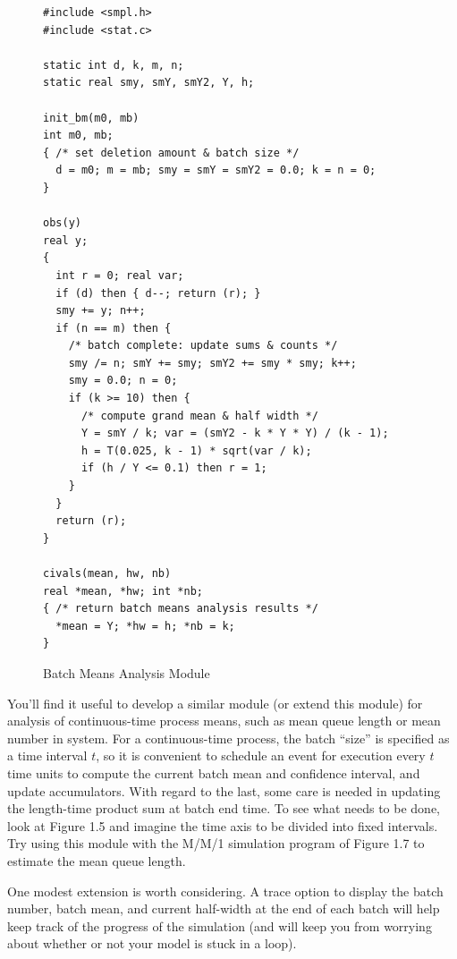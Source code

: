 \begin{figure}[H]
\centering
\begin{lstlisting}[basicstyle=\ttfamily\small,language={}]
#include <smpl.h>
#include <stat.c>

static int d, k, m, n;
static real smy, smY, smY2, Y, h;

init_bm(m0, mb)
int m0, mb;
{ /* set deletion amount & batch size */
  d = m0; m = mb; smy = smY = smY2 = 0.0; k = n = 0;
}

obs(y)
real y;
{
  int r = 0; real var;
  if (d) then { d--; return (r); }
  smy += y; n++;
  if (n == m) then {
    /* batch complete: update sums & counts */
    smy /= n; smY += smy; smY2 += smy * smy; k++;
    smy = 0.0; n = 0;
    if (k >= 10) then {
      /* compute grand mean & half width */
      Y = smY / k; var = (smY2 - k * Y * Y) / (k - 1);
      h = T(0.025, k - 1) * sqrt(var / k);
      if (h / Y <= 0.1) then r = 1;
    }
  }
  return (r);
}

civals(mean, hw, nb)
real *mean, *hw; int *nb;
{ /* return batch means analysis results */
  *mean = Y; *hw = h; *nb = k;
}
\end{lstlisting}
\caption{Batch Means Analysis Module}
\end{figure}
You'll find it useful to develop a similar module (or extend this module)
for analysis of continuous-time process means, such as mean queue length or
mean number in system. For a continuous-time process, the batch ``size'' is
specified as a time interval $t$, so it is convenient to schedule an event for
execution every $t$ time units to compute the current batch mean and confidence
interval, and update accumulators. With regard to the last, some care is
needed in updating the length-time product sum at batch end time. To see what
needs to be done, look at Figure 1.5 and imagine the time axis to be divided
into fixed intervals. Try using this module with the M/M/1 simulation program
of Figure 1.7 to estimate the mean queue length.

One modest extension is worth considering. A trace option to display the
batch number, batch mean, and current half-width at the end of each batch
will help keep track of the progress of the simulation (and will keep you
from worrying about whether or not your model is stuck in a loop).

